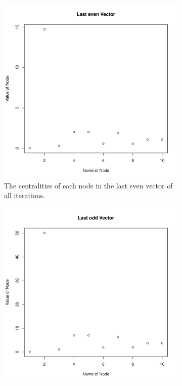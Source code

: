 \begin{figure}[H]
    \centering
    \begin{subfigure}[b]{.45\textwidth}
        \centering
        \includegraphics[width=\textwidth]{images/figures/evenResultVector.pdf}
        \caption{The centralities of each node in the last even vector of all iterations.}
        \label{fig:sub11}
    \end{subfigure}
    \begin{subfigure}[b]{.45\textwidth}
        \centering
        \includegraphics[width=\textwidth]{images/figures/oddResultVector.pdf}

\end{subfigure}
\end{figure}
